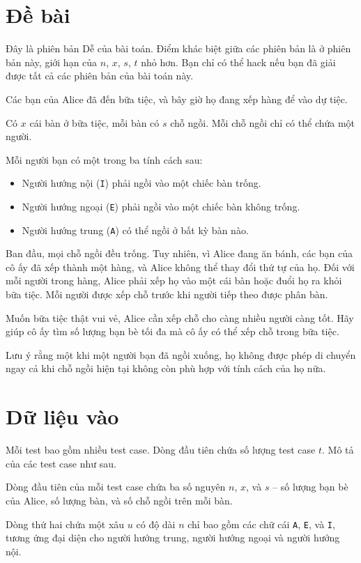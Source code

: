 \documentclass[12pt,a4paper]{article}
\begin{document}
\section*{Đề bài}
Đây là phiên bản Dễ của bài toán. Điểm khác biệt giữa các phiên bản là ở phiên bản này, giới hạn của $n$, $x$, $s$, $t$ nhỏ hơn. Bạn chỉ có thể hack nếu bạn đã giải được tất cả các phiên bản của bài toán này.

Các bạn của Alice đã đến bữa tiệc, và bây giờ họ đang xếp hàng để vào dự tiệc.

Có $x$ cái bàn ở bữa tiệc, mỗi bàn có $s$ chỗ ngồi. Mỗi chỗ ngồi chỉ có thể chứa một người.

Mỗi người bạn có một trong ba tính cách sau:
\begin{itemize}
    \item Người hướng nội (\texttt{I}) phải ngồi vào một chiếc bàn trống.
    \item Người hướng ngoại (\texttt{E}) phải ngồi vào một chiếc bàn không trống.
    \item Người hướng trung (\texttt{A}) có thể ngồi ở bất kỳ bàn nào.
\end{itemize}

Ban đầu, mọi chỗ ngồi đều trống. Tuy nhiên, vì Alice đang ăn bánh, các bạn của cô ấy đã xếp thành một hàng, và Alice không thể thay đổi thứ tự của họ. Đối với mỗi người trong hàng, Alice phải xếp họ vào một cái bàn hoặc đuổi họ ra khỏi bữa tiệc. Mỗi người được xếp chỗ trước khi người tiếp theo được phân bàn.

Muốn bữa tiệc thật vui vẻ, Alice cần xếp chỗ cho càng nhiều người càng tốt. Hãy giúp cô ấy tìm số lượng bạn bè tối đa mà cô ấy có thể xếp chỗ trong bữa tiệc.

Lưu ý rằng một khi một người bạn đã ngồi xuống, họ không được phép di chuyển ngay cả khi chỗ ngồi hiện tại không còn phù hợp với tính cách của họ nữa.

\section*{Dữ liệu vào}
\begin{inputbox}
Mỗi test bao gồm nhiều test case. Dòng đầu tiên chứa số lượng test case $t$. Mô tả của các test case như sau.

Dòng đầu tiên của mỗi test case chứa ba số nguyên $n$, $x$, và $s$ – số lượng bạn bè của Alice, số lượng bàn, và số chỗ ngồi trên mỗi bàn.

Dòng thứ hai chứa một xâu $u$ có độ dài $n$ chỉ bao gồm các chữ cái \texttt{A}, \texttt{E}, và \texttt{I}, tương ứng đại diện cho người hướng trung, người hướng ngoại và người hướng nội.
\end{inputbox}
\end{document}
